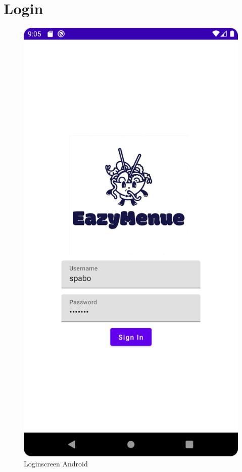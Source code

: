 \section{Login}
\begin{figure}[htp]
    \centering
    \author{Bozidar Spasenovic}
    \includegraphics[scale=0.1]{pics/LoginScreenAnndroid.png}
    \caption{Loginscreen Android}
    \label{fig:impl:LoginScreenAnndroid}
\end{figure}

